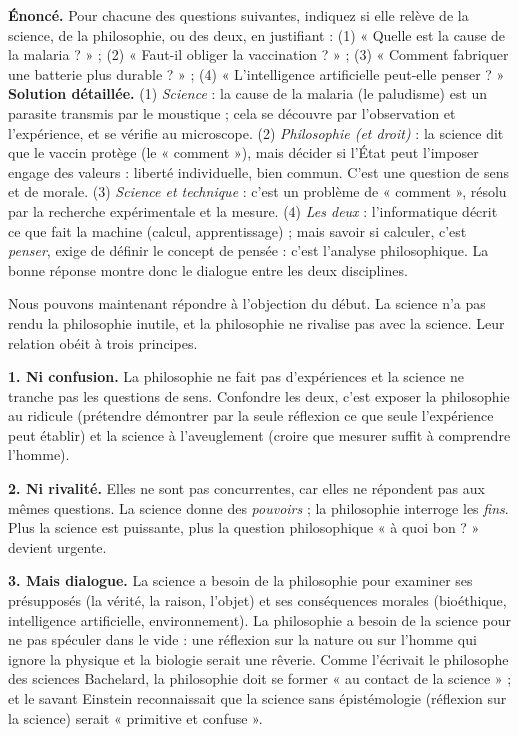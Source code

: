 \documentclass[11pt]{article}
\newcounter{popsec}
\newcounter{popsub}
\newcommand{\courssub}[1]{%
  \stepcounter{popsub}%
  \par\vspace{9pt}\noindent{\popxbold\fontsize{11.5}{13}\selectfont\color{popink}{\color{poporange}\thepopsec.\thepopsub}\hspace{6pt}#1}\par\nopagebreak\vspace{4pt}
}
\begin{document}
\begin{exoresolu}
\textbf{Énoncé.} Pour chacune des questions suivantes, indiquez si elle relève de la science, de la philosophie, ou des deux, en justifiant : (1) « Quelle est la cause de la malaria ? » ; (2) « Faut-il obliger la vaccination ? » ; (3) « Comment fabriquer une batterie plus durable ? » ; (4) « L'intelligence artificielle peut-elle penser ? »
\tcblower
\textbf{Solution détaillée.}
(1) \emph{Science} : la cause de la malaria (le paludisme) est un parasite transmis par le moustique ; cela se découvre par l'observation et l'expérience, et se vérifie au microscope.
(2) \emph{Philosophie (et droit)} : la science dit que le vaccin protège (le « comment »), mais décider si l'État peut l'imposer engage des valeurs : liberté individuelle, bien commun. C'est une question de sens et de morale.
(3) \emph{Science et technique} : c'est un problème de « comment », résolu par la recherche expérimentale et la mesure.
(4) \emph{Les deux} : l'informatique décrit ce que fait la machine (calcul, apprentissage) ; mais savoir si calculer, c'est \emph{penser}, exige de définir le concept de pensée : c'est l'analyse philosophique. La bonne réponse montre donc le dialogue entre les deux disciplines.
\end{exoresolu}

\courssub{Synthèse : ni rivalité ni confusion, mais dialogue}

Nous pouvons maintenant répondre à l'objection du début. La science n'a pas rendu la philosophie inutile, et la philosophie ne rivalise pas avec la science. Leur relation obéit à trois principes.

\textbf{1. Ni confusion.} La philosophie ne fait pas d'expériences et la science ne tranche pas les questions de sens. Confondre les deux, c'est exposer la philosophie au ridicule (prétendre démontrer par la seule réflexion ce que seule l'expérience peut établir) et la science à l'aveuglement (croire que mesurer suffit à comprendre l'homme).

\textbf{2. Ni rivalité.} Elles ne sont pas concurrentes, car elles ne répondent pas aux mêmes questions. La science donne des \emph{pouvoirs} ; la philosophie interroge les \emph{fins}. Plus la science est puissante, plus la question philosophique « à quoi bon ? » devient urgente.

\textbf{3. Mais dialogue.} La science a besoin de la philosophie pour examiner ses présupposés (la vérité, la raison, l'objet) et ses conséquences morales (bioéthique, intelligence artificielle, environnement). La philosophie a besoin de la science pour ne pas spéculer dans le vide : une réflexion sur la nature ou sur l'homme qui ignore la physique et la biologie serait une rêverie. Comme l'écrivait le philosophe des sciences Bachelard, la philosophie doit se former « au contact de la science » ; et le savant Einstein reconnaissait que la science sans épistémologie (réflexion sur la science) serait « primitive et confuse ».
\end{document}
